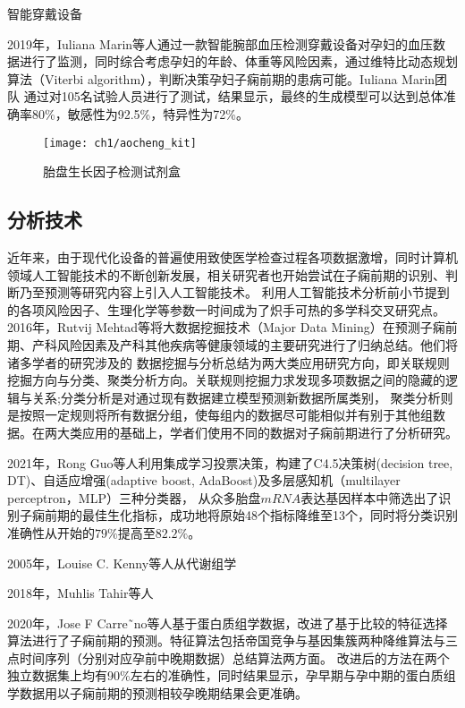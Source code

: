 智能穿戴设备

2019年，Iuliana Marin等人\cite{Marin2019}通过一款智能腕部血压检测穿戴设备对孕妇的血压数据进行了监测，同时综合考虑孕妇的年龄、体重等风险因素，通过维特比动态规划算法（Viterbi algorithm），判断决策孕妇子痫前期的患病可能。Iuliana Marin团队
通过对105名试验人员进行了测试，结果显示，最终的生成模型可以达到总体准确率80\%，敏感性为92.5\%，特异性为72\%。

\begin{figure}[htbp]
    \centering
    \texttt{[image: ch1/aocheng\_kit]}
    \caption{\label{fig:aocheng_kit}胎盘生长因子检测试剂盒}
\end{figure}

\subsection{分析技术}
近年来，由于现代化设备的普遍使用致使医学检查过程各项数据激增，同时计算机领域人工智能技术的不断创新发展，相关研究者也开始尝试在子痫前期的识别、判断乃至预测等研究内容上引入人工智能技术。
利用人工智能技术分析前小节提到的各项风险因子、生理化学等参数一时间成为了炽手可热的多学科交叉研究点。
2016年，Rutvij Mehtad等\cite{Mehta2016}将大数据挖掘技术（Major Data Mining）在预测子痫前期、产科风险因素及产科其他疾病等健康领域的主要研究进行了归纳总结。他们将诸多学者的研究涉及的
数据挖掘与分析总结为两大类应用研究方向，即关联规则挖掘方向与分类、聚类分析方向。关联规则挖掘力求发现多项数据之间的隐藏的逻辑与关系;分类分析是对通过现有数据建立模型预测新数据所属类别，
聚类分析则是按照一定规则将所有数据分组，使每组内的数据尽可能相似并有别于其他组数据\cite{Han2006}。在两大类应用的基础上，学者们使用不同的数据对子痫前期进行了分析研究。

2021年，Rong Guo等人\cite{Guo2021}利用集成学习投票决策，构建了C4.5决策树(decision tree, DT)、自适应增强(adaptive boost, AdaBoost)及多层感知机（multilayer perceptron，MLP）三种分类器，
从众多胎盘$mRNA$表达基因样本中筛选出了识别子痫前期的最佳生化指标，成功地将原始48个指标降维至13个，同时将分类识别准确性从开始的$79\%$提高至$82.2\%$。

2005年，Louise C. Kenny等人从代谢组学

2018年，Muhlis Tahir\cite{Tahir2018}等人

2020年，Jose F Carre˜no等人\cite{Carreno2020}基于蛋白质组学数据，改进了基于比较的特征选择算法进行了子痫前期的预测。特征算法包括帝国竞争与基因集簇两种降维算法与三点时间序列（分别对应孕前中晚期数据）总结算法两方面。
改进后的方法在两个独立数据集上均有90\%左右的准确性，同时结果显示，孕早期与孕中期的蛋白质组学数据用以子痫前期的预测相较孕晚期结果会更准确。

